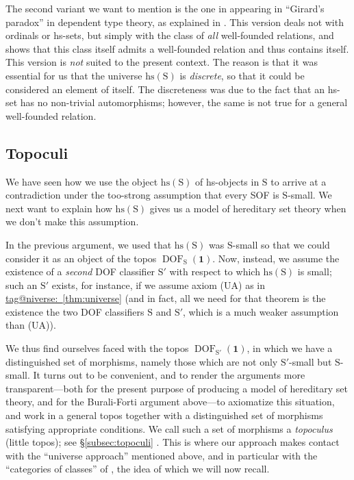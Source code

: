 \documentclass{amsart}
\makeatletter
\newcommand\DOF{\operatorname{DOF}}
\newcommand\hs{\mathrm{hs}}
\newcommand\rS{\mathrm{S}}
\newcommand\tm{\mathbf{1}}
\newcommand\tagword[1]{\csname tag@#1\endcsname}
\def\label@tag#1:#2\@nil{#1}
\newcommand\labeltag[1]{\label@tag#1:\@nil}
\newcommand\jref[1]{%
  \texorpdfstring%
    {\hyperref[#1]{\tagword{\labeltag{#1}}~\ref*{#1}}}%
    {\tagword{\labeltag{#1}}~\ref*{#1}}%
}
\newcommand\prerefpost[3]{%
  \texorpdfstring%
    {\hyperref[#2]{#1\ref*{#2}#3}}%
    {#1\ref*{#2}#3}%
}
\newcommand\sref[1]{\prerefpost{\S}{#1}{}}
\theoremstyle{definition}
\theoremstyle{remark}
\theoremstyle{plainwithref}
\makeatother
\begin{document}
The second variant we want to mention is the one in appearing in ``Girard's paradox'' in dependent type theory, as explained in \cite{ml72}.
This version deals not with ordinals or hs-sets, but simply with the class of \emph{all} well-founded relations, and shows that this class itself admits a well-founded relation and thus contains itself.
This version is \emph{not} suited to the present context.
The reason is that it was essential for us that the universe \( \hs(\rS) \) is \emph{discrete}, so that it could be considered an element of itself.
The discreteness was due to the fact that an hs-set has no non-trivial automorphisms; however, the same is not true for a general well-founded relation.

\subsection{Topoculi} \label{subsec:intro-topoculi}
We have seen how we use the object \( \hs(\rS) \) of hs-objects in \( \rS \) to arrive at a contradiction under the too-strong assumption that every SOF is \( \rS \)-small.
We next want to explain how \( \hs(\rS) \) gives us a model of hereditary set theory when we don't make this assumption.

In the previous argument, we used that \( \hs(\rS) \) was \( \rS \)-small so that we could consider it as an object of the topos \( \DOF_{\rS}(\tm) \).
Now, instead, we assume the existence of a \emph{second} DOF classifier \( \rS' \) with respect to which \( \hs(\rS) \) is small; such an \( \rS' \) exists, for instance, if we assume axiom (UA) as in \jref{thm:universe} (and in fact, all we need for that theorem is the existence the two DOF classifiers \( \rS \) and \( \rS' \), which is a much weaker assumption than (UA)).

We thus find ourselves faced with the topos \( \DOF_{\rS'}(\tm) \), in which we have a distinguished set of morphisms, namely those which are not only \( \rS' \)-small but \( \rS \)-small.
It turns out to be convenient, and to render the arguments more transparent---both for the present purpose of producing a model of hereditary set theory, and for the Burali-Forti argument above---to axiomatize this situation, and work in a general topos together with a distinguished set of morphisms satisfying appropriate conditions.
We call such a set of morphisms a \emph{topoculus} (little topos); see \sref{subsec:topoculi}.
This is where our approach makes contact with the ``universe approach'' mentioned above, and in particular with the ``categories of classes'' of \cite{joyal-moerdijk-ast}, the idea of which we will now recall.
\end{document}
